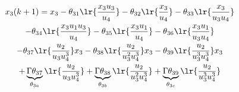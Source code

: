 \begin{multline}
        x_3(k+1) = x_3 - {\theta_{31}} \lr{\frac{x_3 u_3}{u_4}}
                                     - {\theta_{32}} \lr{\frac{x_3}{u_4}}
                                     - {\theta_{33}} \lr{\frac{x_3}{u_3 u_4}} \\
                - {\theta_{34}} \lr{\frac{x_3 u_1 u_3}{u_4}}
                -{\theta_{35}}\lr{\frac{x_3 u_1}{u_4}}
                - {\theta_{36}} \lr{\frac{x_3 u_1}{u_3 u_4}} \\
                - {\theta_{37}}\lr{\frac{u_2}{u_3 u_4^3}} x_3
                - {\theta_{38}}\lr{\frac{u_2}{u_3^2 u_4^3}} x_3
                - {\theta_{39}}\lr{\frac{u_2}{u_3^3 u_4^3}} x_3 \\
                + \underbrace{\Gamma \theta_{37}}_{\theta_{3a}} \lr{\frac{u_2}{u_3 u_4^3}}
                + \underbrace{\Gamma \theta_{38}}_{\theta_{3b}} \lr{\frac{u_2}{u_3^2 u_4^3}}
                + \underbrace{\Gamma \theta_{39}}_{\theta_{3c}} \lr{\frac{u_2}{u_3^3 u_4^3}}
\end{multline}
